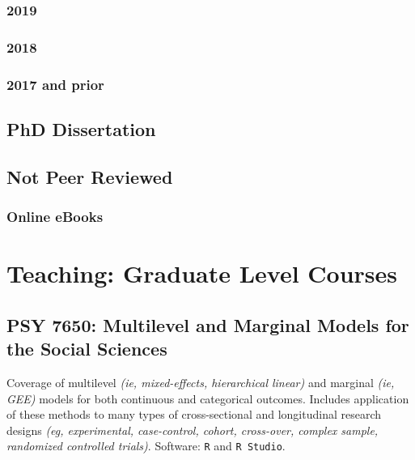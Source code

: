 \documentclass[11pt,a4paper,]{moderncv}
\begin{document}
\hypertarget{section}{%
\subsubsection{2019}\label{section}}

\hypertarget{section-1}{%
\subsubsection{2018}\label{section-1}}

\hypertarget{and-prior}{%
\subsubsection{2017 and prior}\label{and-prior}}

\hypertarget{phd-dissertation}{%
\subsection{PhD Dissertation}\label{phd-dissertation}}

\hypertarget{not-peer-reviewed}{%
\subsection{Not Peer Reviewed}\label{not-peer-reviewed}}

\hypertarget{online-ebooks}{%
\subsubsection{Online eBooks}\label{online-ebooks}}

\clearpage

\hypertarget{teaching-graduate-level-courses}{%
\section{Teaching: Graduate Level
Courses}\label{teaching-graduate-level-courses}}

\hypertarget{psy-7650-multilevel-and-marginal-models-for-the-social-sciences}{%
\subsection{PSY 7650: Multilevel and Marginal Models for the Social
Sciences}\label{psy-7650-multilevel-and-marginal-models-for-the-social-sciences}}

Coverage of multilevel \emph{(ie, mixed-effects, hierarchical linear)}
and marginal \emph{(ie, GEE)} models for both continuous and categorical
outcomes. Includes application of these methods to many types of
cross-sectional and longitudinal research designs \emph{(eg,
experimental, case-control, cohort, cross-over, complex sample,
randomized controlled trials)}. Software: \texttt{R} and
\texttt{R\ Studio}.
\end{document}
